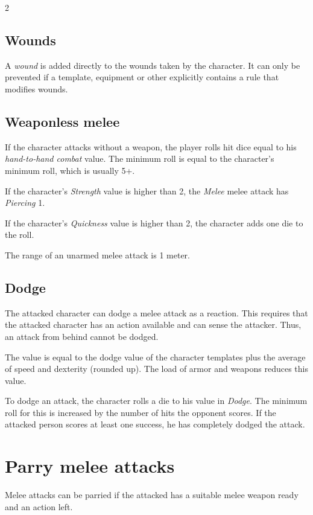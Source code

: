 \begin{multicols}{2}
\subsection{Wounds}

A \textit{wound} is added directly to the wounds taken by the character. It can only be prevented if a template, equipment or other explicitly contains a rule that modifies wounds.

\subsection{Weaponless melee}

If the character attacks without a weapon, the player rolls hit dice equal to his \textit{hand-to-hand combat} value. The minimum roll is equal to the character's minimum roll, which is usually 5+.

If the character's \textit{Strength} value is higher than 2, the \textit{Melee} melee attack has \textit{Piercing} 1.

If the character's \textit{Quickness} value is higher than 2, the character adds one die to the roll.

The range of an unarmed melee attack is 1 meter.

\subsection{Dodge}

The attacked character can dodge a melee attack as a reaction. This requires that the attacked character has an action available and can sense the attacker. Thus, an attack from behind cannot be dodged.

The value is equal to the dodge value of the character templates plus the average of speed and dexterity (rounded up). The load of armor and weapons reduces this value.

To dodge an attack, the character rolls a die to his value in \textit{Dodge}. The minimum roll for this is increased by the number of hits the opponent scores. If the attacked person scores at least one success, he has completely dodged the attack.

\section{Parry melee attacks}

Melee attacks can be parried if the attacked has a suitable melee weapon ready and an action left.


\end{multicols}
